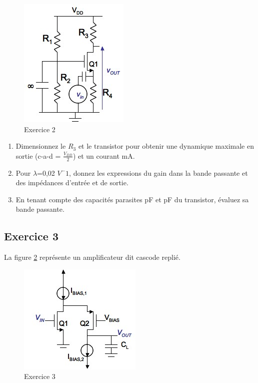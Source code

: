 \documentclass[paper=a4, fontsize=11pt]{article} %
\numberwithin{equation}{section} %
\numberwithin{figure}{section} %
\numberwithin{table}{section} %
\begin{document}
\begin{figure}[!htbp]
   \centering
   \includegraphics[]{figure/fig3-2.png}
   \caption{Exercice 2}
   \label{fig3-2}
\end{figure}

\begin{enumerate}
	\item Dimensionnez le $R_3$ et le transistor pour obtenir une dynamique maximale en sortie (c-a-d \vout = $\frac{V_{DD}}{2}$) et un courant  mA.
	\item Pour $\lambda$=0,02 $V^-1$, donnez les expressions du gain dans la bande passante et des impédances d'entrée et de sortie.
	\item En tenant compte des capacités parasites  pF et  pF du transistor, évaluez sa bande passante.
\end{enumerate}
\newpage

\subsection*{Exercice 3}
La figure \ref{fig3-3} représente un amplificateur dit cascode replié.
\begin{figure}[!htbp]
   \centering
   \includegraphics[]{figure/fig3-3.png}
   \caption{Exercice 3}
   \label{fig3-3}
\end{figure}
\end{document}
